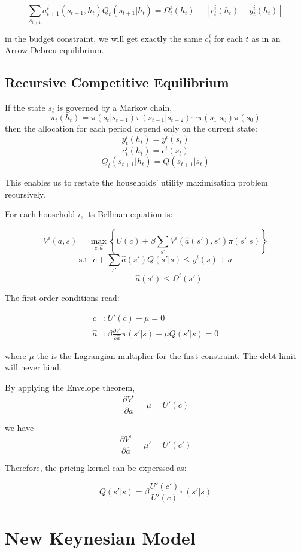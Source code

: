 \documentclass[10pt,a4]{article}
\begin{document}
$$ \sum_{s_{t+1}} a_{t+1}^i(s_{t+1},h_t)Q_t(s_{t+1}|h_t) = \Omega_t^i(h_t) - [c_t^i(h_t) - y_t^i(h_t)]$$

in the budget constraint, we will get exactly the same $c_t^i$ for each $t$ as in an Arrow-Debreu equilibrium.

\subsection{Recursive Competitive
Equilibrium}

{\label{763184}}\par\null

If the state $s_t$ is governed by a Markov chain, 
$$ \pi_t(h_t) = \pi(s_t|s_{t-1})\pi(s_{t-1}|s_{t-2})\cdots\pi(s_1|s_0)\pi(s_0) $$
then the allocation for each period depend only on the current state: 
$$ y_t^i(h_t) = y^i(s_t) $$
$$ c_t^i(h_t) = c^i(s_t) $$
$$ Q_t(s_{t+1}|h_t) = Q(s_{t+1}|s_t) $$

This enables us to restate the households' utility maximisation problem
recursively.~

\par\null

For each household $i$, its Bellman equation is:

$$ V^i(a,s) = \max_{c, \hat a} \left\{ U(c) + \beta \sum_{s'}V^i(\hat a(s'), s')\pi(s'|s)\right\} $$
$$ \textrm{s.t. } c+ \sum_{s'}\hat a(s')Q(s'|s) \le y^i(s) + a $$
$$ \qquad -\hat a(s') \le \Omega^i(s') $$

The first-order conditions read:

\[
    \begin{aligned}
        c &: U'(c) - \mu = 0 \\
        \hat a &: \beta\frac{\partial V^i}{\partial\hat a}\pi(s'|s) - \mu Q(s'|s) = 0
    \end{aligned}
\]

where $\mu$ the is the Lagrangian multiplier for the first constraint. The debt limit will never bind.

By applying the Envelope theorem, 
$$ \frac{\partial V^i}{\partial a} = \mu = U'(c) $$

we have 
$$ \frac{\partial V^i}{\partial\hat a} = \mu' = U'(c') $$

Therefore, the pricing kernel can be experssed as:

$$ Q(s'|s) = \beta\frac{U'(c')}{U'(c)}\pi(s'|s) $$

\newpage 

\section{New Keynesian Model}
\end{document}
